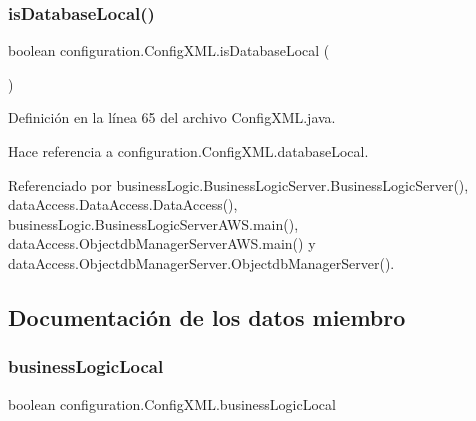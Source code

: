 \mbox{\label{classconfiguration_1_1ConfigXML_a2ee9afbde36aa3f5c0d0158a8b5449fb}} 
\subsubsection{\texorpdfstring{isDatabaseLocal()}{isDatabaseLocal()}}
{\footnotesize\ttfamily boolean configuration.\+Config\+X\+M\+L.\+is\+Database\+Local (\begin{DoxyParamCaption}{ }\end{DoxyParamCaption})}



Definición en la línea 65 del archivo Config\+X\+M\+L.\+java.


\begin{DoxyCode}{0}

\end{DoxyCode}


Hace referencia a configuration.\+Config\+X\+M\+L.\+database\+Local.



Referenciado por business\+Logic.\+Business\+Logic\+Server.\+Business\+Logic\+Server(), data\+Access.\+Data\+Access.\+Data\+Access(), business\+Logic.\+Business\+Logic\+Server\+A\+W\+S.\+main(), data\+Access.\+Objectdb\+Manager\+Server\+A\+W\+S.\+main() y data\+Access.\+Objectdb\+Manager\+Server.\+Objectdb\+Manager\+Server().



\subsection{Documentación de los datos miembro}
\mbox{\label{classconfiguration_1_1ConfigXML_ab30a83d21460a743a7a86955de08da3a}} 
\subsubsection{\texorpdfstring{businessLogicLocal}{businessLogicLocal}}
{\footnotesize\ttfamily boolean configuration.\+Config\+X\+M\+L.\+business\+Logic\+Local\hspace{0.3cm}{\ttfamily [private]}}



